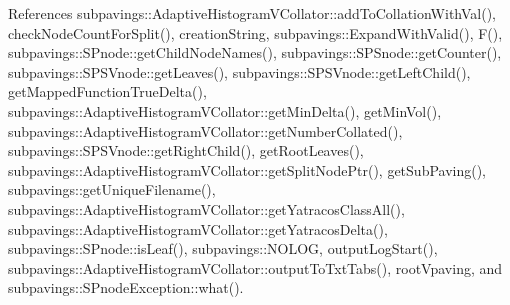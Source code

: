 \-References subpavings\-::\-Adaptive\-Histogram\-V\-Collator\-::add\-To\-Collation\-With\-Val(), check\-Node\-Count\-For\-Split(), creation\-String, subpavings\-::\-Expand\-With\-Valid(), \-F(), subpavings\-::\-S\-Pnode\-::get\-Child\-Node\-Names(), subpavings\-::\-S\-P\-Snode\-::get\-Counter(), subpavings\-::\-S\-P\-S\-Vnode\-::get\-Leaves(), subpavings\-::\-S\-P\-S\-Vnode\-::get\-Left\-Child(), get\-Mapped\-Function\-True\-Delta(), subpavings\-::\-Adaptive\-Histogram\-V\-Collator\-::get\-Min\-Delta(), get\-Min\-Vol(), subpavings\-::\-Adaptive\-Histogram\-V\-Collator\-::get\-Number\-Collated(), subpavings\-::\-S\-P\-S\-Vnode\-::get\-Right\-Child(), get\-Root\-Leaves(), subpavings\-::\-Adaptive\-Histogram\-V\-Collator\-::get\-Split\-Node\-Ptr(), get\-Sub\-Paving(), subpavings\-::get\-Unique\-Filename(), subpavings\-::\-Adaptive\-Histogram\-V\-Collator\-::get\-Yatracos\-Class\-All(), subpavings\-::\-Adaptive\-Histogram\-V\-Collator\-::get\-Yatracos\-Delta(), subpavings\-::\-S\-Pnode\-::is\-Leaf(), subpavings\-::\-N\-O\-L\-O\-G, output\-Log\-Start(), subpavings\-::\-Adaptive\-Histogram\-V\-Collator\-::output\-To\-Txt\-Tabs(), root\-Vpaving, and subpavings\-::\-S\-Pnode\-Exception\-::what().


